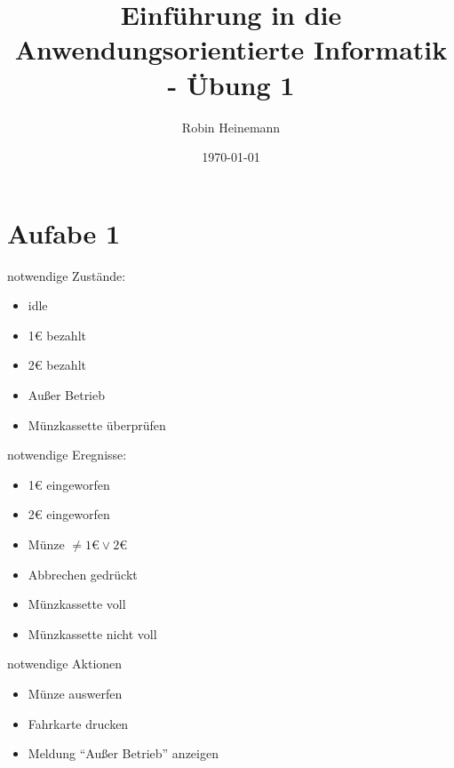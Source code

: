 \documentclass[koma,a4paper,10pt]{org-article}
\author{Robin Heinemann}
\date{\today}
\title{Einführung in die Anwendungsorientierte Informatik - Übung 1}
\begin{document}
\maketitle

\section{Aufabe 1}
\label{sec-1}
notwendige Zustände:
\begin{itemize}
\item idle
\item 1€ bezahlt
\item 2€ bezahlt
\item Außer Betrieb
\item Münzkassette überprüfen
\end{itemize}
notwendige Eregnisse:
\begin{itemize}
\item 1€ eingeworfen
\item 2€ eingeworfen
\item Münze $\neq 1€ \vee 2€$
\item Abbrechen gedrückt
\item Münzkassette voll
\item Münzkassette nicht voll
\end{itemize}
notwendige Aktionen
\begin{itemize}
\item Münze auswerfen
\item Fahrkarte drucken
\item Meldung "`Außer Betrieb"' anzeigen
\end{itemize}
\end{document}
